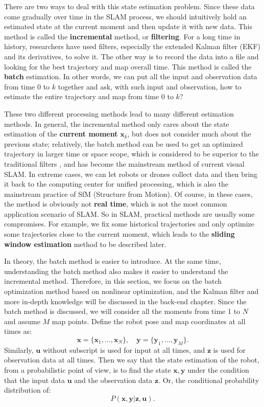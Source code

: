 There are two ways to deal with this state estimation problem. Since these data come gradually over time in the SLAM process, we should intuitively hold an estimated state at the current moment and then update it with new data. This method is called the \textbf {incremental} method, or \textbf{filtering}. For a long time in history, researchers have used filters, especially the extended Kalman filter (EKF) and its derivatives, to solve it. The other way is to record the data into a file and looking for the best trajectory and map overall time. This method is called the \textbf {batch} estimation. In other words, we can put all the input and observation data from time 0 to $ k $ together and ask, with such input and observation, how to estimate the entire trajectory and map from time 0 to $ k $?

These two different processing methods lead to many different estimation methods. In general, the incremental method only cares about the state estimation of the \textbf {current moment} $ \bm {x} _k $, but does not consider much about the previous state; relatively, the batch method can be used to get an optimized trajectory in larger time or space scope, which is considered to be superior to the traditional filters \textsuperscript {\cite {Strasdat2012}}, and has become the mainstream method of current visual SLAM. In extreme cases, we can let robots or drones collect data and then bring it back to the computing center for unified processing, which is also the mainstream practice of SfM (Structure from Motion). Of course, in these cases, the method is obviously not \textbf {real time}, which is not the most common application scenario of SLAM. So in SLAM, practical methods are usually some compromises. For example, we fix some historical trajectories and only optimize some trajectories close to the current moment, which leads to the \textbf {sliding window estimation} method to be described later.

In theory, the batch method is easier to introduce. At the same time, understanding the batch method also makes it easier to understand the incremental method. Therefore, in this section, we focus on the batch optimization method based on nonlinear optimization, and the Kalman filter and more in-depth knowledge will be discussed in the back-end chapter. Since the batch method is discussed, we will consider all the moments from time 1 to $N$ and assume $M$ map points. Define the robot pose and map coordinates at all times as:
\[
\bm{x}=\{ \bm{x}_1, \ldots, \bm{x}_N \}, \quad \bm{y} = \{\bm{y}_1, \ldots, \bm{y}_M \}.
\]
Similarly, $ \bm {u} $ without subscript is used for input at all times, and $ \bm {z} $ is used for observation data at all times. Then we say that the state estimation of the robot, from a probabilistic point of view, is to find the state $ \bm {x}, \bm{y}$ under the condition that the input data $ \bm {u} $ and the observation data $\bm{z} $. Or, the conditional probability distribution of:
\begin{equation}
P( \bm{x},\bm{y} | \bm{z}, \bm{u}).
\end{equation}

